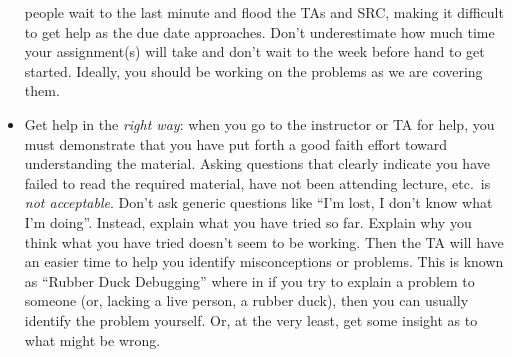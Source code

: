 \documentclass[12pt]{scrartcl}
\begin{document}
\begin{itemize}
  people wait to the last minute and flood the TAs and SRC, making it difficult
  to get help as the due date approaches.  Don't underestimate how much time 
  your assignment(s) will take and don't wait to the week before hand to get 
  started.  Ideally, you should be working on the problems as we are covering 
  them.
  \item Get help in the \emph{right way}: when you go to the instructor or
  TA for help, you must demonstrate that you have put forth a good faith 
  effort toward understanding the material.  Asking questions that clearly 
  indicate you have failed to read the required material, have not been
  attending lecture, etc.\ is \emph{not acceptable}.  Don't ask generic
  questions like ``I'm lost, I don't know what I'm doing''.  Instead, 
  explain what you have tried so far.  Explain why you think what you 
  have tried doesn't seem to be working.  Then the TA will have an 
  easier time to help you identify misconceptions or problems.  This 
  is known as ``Rubber Duck Debugging'' where in if you try to explain 
  a problem to someone (or, lacking a live person, a rubber duck), 
  then you can usually identify the problem yourself.  Or, at the very 
  least, get some insight as to what might be wrong.
\end{itemize}
\end{document}
